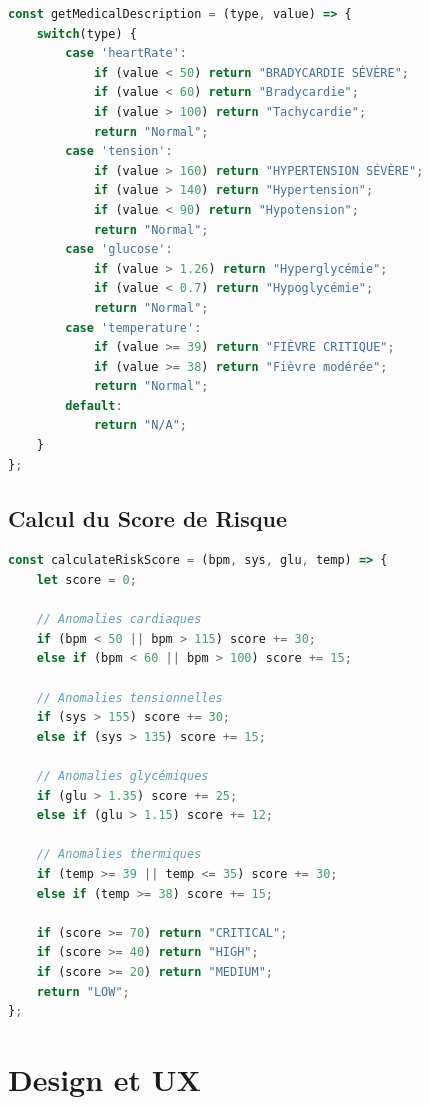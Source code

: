 \documentclass[12pt,french]{report}
\begin{document}
\begin{lstlisting}[language=JavaScript, caption=Analyse médicale]
const getMedicalDescription = (type, value) => {
    switch(type) {
        case 'heartRate':
            if (value < 50) return "BRADYCARDIE SÉVÈRE";
            if (value < 60) return "Bradycardie";
            if (value > 100) return "Tachycardie";
            return "Normal";
        case 'tension':
            if (value > 160) return "HYPERTENSION SÉVÈRE";
            if (value > 140) return "Hypertension";
            if (value < 90) return "Hypotension";
            return "Normal";
        case 'glucose':
            if (value > 1.26) return "Hyperglycémie";
            if (value < 0.7) return "Hypoglycémie";
            return "Normal";
        case 'temperature':
            if (value >= 39) return "FIÈVRE CRITIQUE";
            if (value >= 38) return "Fièvre modérée";
            return "Normal";
        default:
            return "N/A";
    }
};
\end{lstlisting}

\subsection{Calcul du Score de Risque}

\begin{lstlisting}[language=JavaScript, caption=Score de risque]
const calculateRiskScore = (bpm, sys, glu, temp) => {
    let score = 0;
    
    // Anomalies cardiaques
    if (bpm < 50 || bpm > 115) score += 30;
    else if (bpm < 60 || bpm > 100) score += 15;
    
    // Anomalies tensionnelles
    if (sys > 155) score += 30;
    else if (sys > 135) score += 15;
    
    // Anomalies glycémiques
    if (glu > 1.35) score += 25;
    else if (glu > 1.15) score += 12;
    
    // Anomalies thermiques
    if (temp >= 39 || temp <= 35) score += 30;
    else if (temp >= 38) score += 15;
    
    if (score >= 70) return "CRITICAL";
    if (score >= 40) return "HIGH";
    if (score >= 20) return "MEDIUM";
    return "LOW";
};
\end{lstlisting}

\section{Design et UX}
\end{document}

